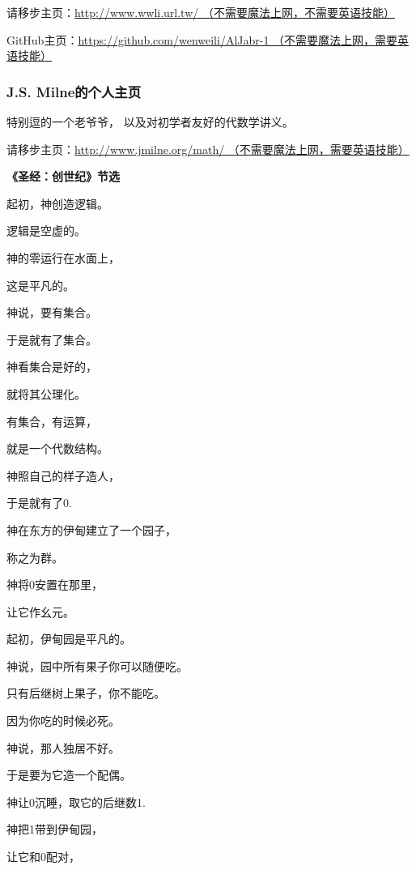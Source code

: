 请移步主页：\href{http://www.wwli.url.tw/}
{http://www.wwli.url.tw/
（不需要魔法上网，不需要英语技能）}\vsp

GitHub主页：\href{https://github.com/wenweili/AlJabr-1}
{https://github.com/wenweili/AlJabr-1
（不需要魔法上网，需要英语技能）}

\subsubsection*{J.S. Milne的个人主页}

特别逗的一个老爷爷，
以及对初学者友好的代数学讲义。\vsp

请移步主页：\href{http://www.jmilne.org/math/}
{http://www.jmilne.org/math/
（不需要魔法上网，需要英语技能）}\vsp

\newpage

\begin{centering}
\begin{Huge}
\textbf{《圣经：创世纪》节选}
\end{Huge}\vsp
\large

起初，神创造逻辑。

逻辑是空虚的。

神的零运行在水面上，

这是平凡的。

神说，要有集合。

于是就有了集合。

神看集合是好的，

就将其公理化。

有集合，有运算，

就是一个代数结构。\vsp

神照自己的样子造人，

于是就有了0.

神在东方的伊甸建立了一个园子，

称之为群。

神将0安置在那里，

让它作幺元。

起初，伊甸园是平凡的。

神说，园中所有果子你可以随便吃。

只有后继树上果子，你不能吃。

因为你吃的时候必死。\vsp

神说，那人独居不好。

于是要为它造一个配偶。

神让0沉睡，取它的后继数1.

神把1带到伊甸园，

让它和0配对，


\end{centering}
